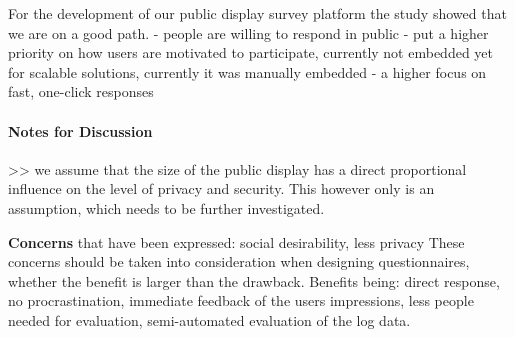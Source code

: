 
	For the development of our public display survey platform the study showed that we are on a good path. 
		- people are willing to respond in public
		- put a higher priority on how users are motivated to participate, currently not embedded yet for scalable solutions, currently it was manually embedded
		- a higher focus on fast, one-click responses



\paragraph{Notes for Discussion}

>> we assume that the size of the public display has a direct proportional influence on the level of privacy and security. This however only is an assumption, which needs to be further investigated.

	\textbf{Concerns} that have been expressed: social desirability, less privacy
	These concerns should be taken into consideration when designing questionnaires, whether the benefit is larger than the drawback. Benefits being: direct response, no procrastination, immediate feedback of the users impressions, less people needed for evaluation, semi-automated evaluation of the log data.





